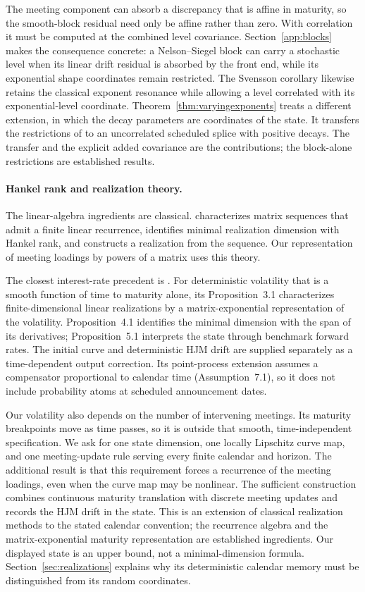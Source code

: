 The meeting component can absorb a discrepancy that is affine in maturity, so the smooth-block residual need only be affine rather than zero. With correlation it must be computed at the combined level covariance. Section~\ref{app:blocks} makes the consequence concrete: a Nelson--Siegel block can carry a stochastic level when its linear drift residual is absorbed by the front end, while its exponential shape coordinates remain restricted. The Svensson corollary likewise retains the classical exponent resonance while allowing a level correlated with its exponential-level coordinate. Theorem~\ref{thm:varyingexponents} treats a different extension, in which the decay parameters are coordinates of the state. It transfers the restrictions of \citet{filipovic2000exponential} to an uncorrelated scheduled splice with positive decays. The transfer and the explicit added covariance are the contributions; the block-alone restrictions are established results.

\paragraph{Hankel rank and realization theory.}
The linear-algebra ingredients are classical. \citet[Propositions 1--2 and Theorem 1]{hokalman1966effective} characterizes matrix sequences that admit a finite linear recurrence, identifies minimal realization dimension with Hankel rank, and constructs a realization from the sequence. Our representation of meeting loadings by powers of a matrix uses this theory.

The closest interest-rate precedent is \citet{bjork1999minimal}. For deterministic volatility that is a smooth function of time to maturity alone, its Proposition~3.1 characterizes finite-dimensional linear realizations by a matrix-exponential representation of the volatility. Proposition~4.1 identifies the minimal dimension with the span of its derivatives; Proposition~5.1 interprets the state through benchmark forward rates. The initial curve and deterministic HJM drift are supplied separately as a time-dependent output correction. Its point-process extension assumes a compensator proportional to calendar time (Assumption~7.1), so it does not include probability atoms at scheduled announcement dates.

Our volatility also depends on the number of intervening meetings. Its maturity breakpoints move as time passes, so it is outside that smooth, time-independent specification. We ask for one state dimension, one locally Lipschitz curve map, and one meeting-update rule serving every finite calendar and horizon. The additional result is that this requirement forces a recurrence of the meeting loadings, even when the curve map may be nonlinear. The sufficient construction combines continuous maturity translation with discrete meeting updates and records the HJM drift in the state. This is an extension of classical realization methods to the stated calendar convention; the recurrence algebra and the matrix-exponential maturity representation are established ingredients. Our displayed state is an upper bound, not a minimal-dimension formula. Section~\ref{sec:realizations} explains why its deterministic calendar memory must be distinguished from its random coordinates.

